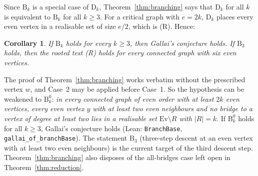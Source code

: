 \documentclass[11pt]{amsart}
\newtheorem{corollary}[theorem]{Corollary}
\theoremstyle{definition}
\newcommand{\Ev}{\mathrm{Ev}}
\begin{document}
Since $\mathrm{B}_k$ is a special case of $\mathrm{D}_k$, Theorem~\ref{thm:branching} says that
$\mathrm{D}_k$ for all $k$ is equivalent to $\mathrm{B}_k$ for all $k\ge3$. For a critical graph with
$e=2k$, $\mathrm{D}_k$ places every even vertex in a realisable set of size $e/2$, which is (R). Hence:

\begin{corollary}\label{cor:branching}
If $\mathrm{B}_k$ holds for every $k\ge3$, then Gallai's conjecture holds. If $\mathrm{B}_3$ holds,
then the rooted test (R) holds for every connected graph with six even vertices.
\end{corollary}

The proof of Theorem~\ref{thm:branching} works verbatim without the prescribed vertex $w$, and Case~2
may be applied before Case~1. So the hypothesis can be weakened to $\mathrm{B}^0_k$: \emph{in every
connected graph of even order with at least $2k$ even vertices, every even vertex $y$ with at least two
even neighbours and no bridge to a vertex of degree at least two lies in a realisable set
$\Ev\setminus R$ with $|R|=k$}. If $\mathrm{B}^0_k$ holds for all $k\ge3$, Gallai's conjecture holds
(Lean: \texttt{BranchBase}, \texttt{gallai\_of\_branchBase}). The statement $\mathrm{B}_3$ (three-step
descent at an even vertex with at least two even neighbours) is the current target of the third
descent step. Theorem~\ref{thm:branching} also disposes of the
all-bridges case left open in Theorem~\ref{thm:reduction}.
\end{document}
